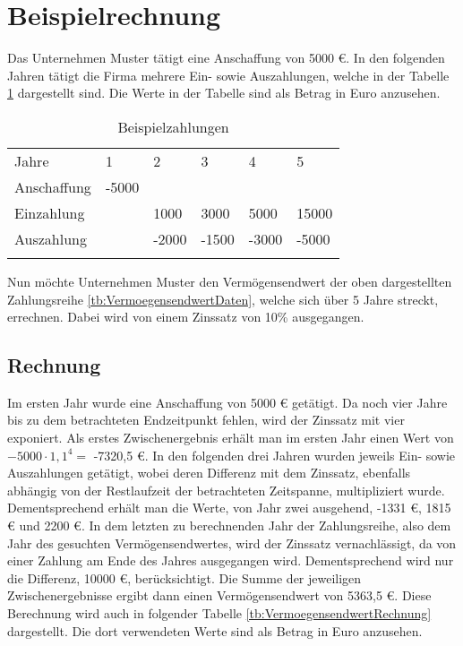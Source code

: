 \section{Beispielrechnung}

Das Unternehmen Muster tätigt eine Anschaffung von 5000 €. In den folgenden Jahren tätigt die Firma mehrere Ein- sowie Auszahlungen, welche in der Tabelle \ref{tb:VermoegensendwertDaten} dargestellt sind. Die Werte in der Tabelle sind als Betrag in Euro anzusehen.

\bigskip

\begin{table}[!h]
    \begin{tabular}{llllll}
        \cline{1-6} \rowcolor{gray}
        Jahre       & 1     & 2     & 3     & 4     & 5     \\ \cline{1-6} \rowcolor{white}
        Anschaffung & -5000 &       &       &       &       \\ \cline{1-6} \rowcolor{white}
        Einzahlung  &       & 1000  & 3000  & 5000  & 15000 \\ \cline{1-6} \rowcolor{white}
        Auszahlung  &       & -2000 & -1500 & -3000 & -5000 \\ \cline{1-6} \rowcolor{white}
    \end{tabular}
    \caption{Beispielzahlungen}
    \label{tb:VermoegensendwertDaten}
\end{table}

\bigskip
\noindent
Nun möchte Unternehmen Muster den Vermögensendwert der oben dargestellten Zahlungsreihe \eqref{tb:VermoegensendwertDaten}, welche sich über 5 Jahre streckt, errechnen. Dabei wird von einem Zinssatz von 10\% ausgegangen.
\subsection{Rechnung}

Im ersten Jahr wurde eine Anschaffung von 5000 € getätigt. Da noch vier Jahre bis zu dem betrachteten Endzeitpunkt fehlen, wird der Zinssatz mit vier exponiert. Als erstes Zwischenergebnis erhält man im ersten Jahr einen Wert von $-5000 \cdot 1,1^4 =$ -7320,5 €. In den folgenden drei Jahren wurden jeweils Ein- sowie Auszahlungen getätigt, wobei deren Differenz mit dem Zinssatz, ebenfalls abhängig von der Restlaufzeit der betrachteten Zeitspanne, multipliziert wurde. Dementsprechend erhält man die Werte, von Jahr zwei ausgehend, -1331 €, 1815 € und 2200 €. In dem letzten zu berechnenden Jahr der Zahlungsreihe, also dem Jahr des gesuchten Vermögensendwertes, wird der Zinssatz vernachlässigt, da von einer Zahlung am Ende des Jahres ausgegangen wird. Dementsprechend wird nur die Differenz, 10000 €, berücksichtigt. Die Summe der jeweiligen Zwischenergebnisse ergibt dann einen Vermögensendwert von 5363,5 €. Diese Berechnung wird auch in folgender Tabelle \ref{tb:VermoegensendwertRechnung} dargestellt. Die dort verwendeten Werte sind als Betrag in Euro anzusehen.

